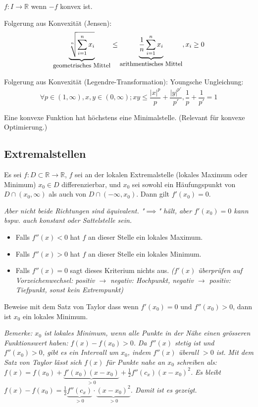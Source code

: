 $f:I \rightarrow \mathbb{R}$  wenn $-f$ konvex ist.

Folgerung aus Konvexität (Jensen): 
$$\underbrace{\sqrt[n]{\sum_{i=1}^{n}x_i}}_{\text{\small{geometrisches Mittel}}}\leq \underbrace{\frac{1}{n}\sum_{i=1}^{n}x_i}_{\text{\small{arithmentisches Mittel}}}, x_i \geq 0$$

Folgerung aus Konvexität (Legendre-Transformation): Youngsche Ungleichung:
$$\forall p \in (1,\infty), x,y \in (0,\infty); xy \leq \frac{|x|^p}{p}+\frac{|y|^{p'}}{p'}, \frac{1}{p}+\frac{1}{p'}=1$$

Eine konvexe Funktion hat höchstens eine Minimalstelle. (Relevant für konvexe Optimierung.)

\subsection{Extremalstellen}

Es sei $f: D \subset \mathbb{R} \rightarrow \mathbb{R}$, $f$ sei an der lokalen Extremalstelle \small{(lokales Maximum oder Minimum)} $x_0 \in D$ differenzierbar, und $x_0$ sei sowohl ein Häufungspunkt von $D \cap (x_0, \infty)$ als auch von $D \cap (-\infty, x_0)$. Dann gilt $f'(x_0)=0$.

\textit{Aber nicht beide Richtungen sind äquivalent. "$\implies$" hält, aber $f'(x_0)=0$ kann bspw. auch konstant oder Sattelstelle sein.}

\begin{itemize}
    \item Falls $f''(x)<0$ hat $f$ an dieser Stelle ein lokales Maximum.
    \item Falls $f''(x)>0$ hat $f$ an dieser Stelle ein lokales Minimum.
    \item Falls $f''(x)=0$ sagt dieses Kriterium nichts aus.
    \textit{($f'(x)$ überprüfen auf Vorzeichenwechsel: positiv $\rightarrow$ negativ: Hochpunkt, negativ $\rightarrow$ positiv: Tiefpunkt, sonst kein Extrempunkt)}
\end{itemize}

\begin{exercise}
    Beweise mit dem Satz von Taylor dass wenn $f'(x_0) = 0$ und $f''(x_0) > 0$, dann ist $x_0$ ein lokales Minimum.

    \textit{Bemerke: $x_0$ ist lokales Minimum, wenn alle Punkte in der Nähe einen grösseren Funktionswert haben: $f(x)-f(x_0)>0$.}
    \textit{Da $f''(x)$ stetig ist und $f''(x_0)>0$, gibt es ein Intervall um $x_0$, indem $f''(x)$ überall $>0$ ist.}
    \textit{Mit dem Satz von Taylor lässt sich $f(x)$ für Punkte nahe an $x_0$ schreiben als: $f(x)=f(x_0)+\underbrace{f'(x_0)(x-x_0)}_{>0} + \frac{1}{2}f''(c_x)(x-x_0)^2$.}
    \textit{Es bleibt $f(x)-f(x_0)=\frac{1}{2}\underbrace{f''(c_x)}_{>0} \cdot \underbrace{(x-x_0)^2}_{>0}$. Damit ist es gezeigt.}
\end{exercise}

